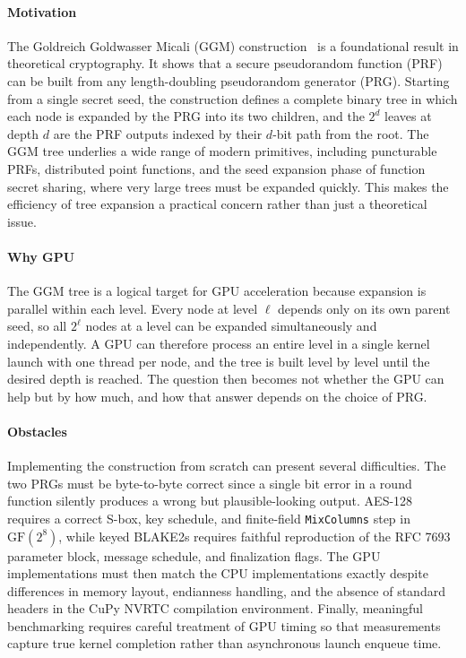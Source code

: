 \documentclass[conference]{IEEEtran}
\begin{document}
\paragraph{Motivation}
The Goldreich Goldwasser Micali (GGM) construction~\cite{ggm1986} is a foundational result in theoretical cryptography. It shows that a secure pseudorandom function (PRF) can be built from any length-doubling pseudorandom generator (PRG). Starting from a single secret seed, the construction defines a complete binary tree in which each node is expanded by the PRG into its two children, and the $2^d$ leaves at depth $d$ are the PRF outputs indexed by their $d$-bit path from the root. The GGM tree underlies a wide range of modern primitives, including puncturable PRFs, distributed point functions, and the seed expansion phase of function secret sharing, where very large trees must be expanded quickly. This makes the efficiency of tree expansion a practical concern rather than just a theoretical issue.

\paragraph{Why GPU}
The GGM tree is a logical target for GPU acceleration because expansion is parallel within each level. Every node at level $\ell$ depends only on its own parent seed, so all $2^\ell$ nodes at a level can be expanded simultaneously and independently. A GPU can therefore process an entire level in a single kernel launch with one thread per node, and the tree is built level by level until the desired depth is reached. The question then becomes not whether the GPU can help but by how much, and how that answer depends on the choice of PRG.

\paragraph{Obstacles}
Implementing the construction from scratch can present several difficulties. The two PRGs must be byte-to-byte correct since a single bit error in a round function silently produces a wrong but plausible-looking output. AES-128 requires a correct S-box, key schedule, and finite-field \texttt{MixColumns} step in $\mathrm{GF}(2^8)$, while keyed BLAKE2s requires faithful reproduction of the RFC 7693 parameter block, message schedule, and finalization flags. The GPU implementations must then match the CPU implementations exactly despite differences in memory layout, endianness handling, and the absence of standard headers in the CuPy NVRTC compilation environment. Finally, meaningful benchmarking requires careful treatment of GPU timing so that measurements capture true kernel completion rather than asynchronous launch enqueue time.
\end{document}
